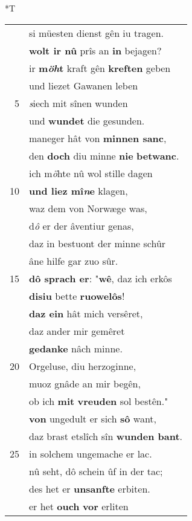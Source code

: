 \documentclass[8pt,a4paper,notitlepage]{article}
\begin{document}
\begin{table}[ht]
\hspace{0.5cm}
\begin{minipage}[t]{0.5\linewidth}
\small
\begin{center}*T
\end{center}
\begin{tabular}{rl}
 & si müesten dienst gên iu tragen.\\ 
 & \textbf{wolt ir nû} prîs an \textbf{in} bejagen?\\ 
 & ir \textbf{m\textit{öh}t} kraft gên \textbf{kreften} geben\\ 
 & und liezet Gawanen leben\\ 
5 & \textit{s}iech mit sînen wunden\\ 
 & und \textbf{wundet} die gesunden.\\ 
 & maneger hât von \textbf{minnen sanc},\\ 
 & den \textbf{doch} diu minne \textbf{nie} \textbf{betwanc}.\\ 
 & ich m\textit{ö}hte nû wol stille dagen\\ 
10 & \textbf{und liez mî\textit{n}e} klagen,\\ 
 & waz dem von Norwæge was,\\ 
 & d\textit{ô} er der âventiur genas,\\ 
 & daz in bestuont der minne schûr\\ 
 & âne hilfe gar zuo sûr.\\ 
15 & \textbf{dô sprach er}: "\textbf{wê}, daz ich erkôs\\ 
 & \textbf{disiu} bette \textbf{ruowelôs}!\\ 
 & \textbf{daz ein} hât mich versêret,\\ 
 & daz ander mir gemêret\\ 
 & \textbf{gedanke} nâch minne.\\ 
20 & Orgeluse, diu herzoginne,\\ 
 & muoz gnâde an mir begên,\\ 
 & ob ich \textbf{mit} \textbf{vreuden} sol bestên."\\ 
 & \textbf{von} ungedult er sich \textbf{sô} want,\\ 
 & daz brast etslîch sîn \textbf{wunden bant}.\\ 
25 & in solchem ungemache er lac.\\ 
 & nû seht, dô schein ûf in der tac;\\ 
 & des het er \textbf{unsanfte} erbiten.\\ 
 & er het \textbf{ouch} \textbf{vor} erliten\\ 

\end{tabular}
\end{minipage}
\end{table}
\end{document}

